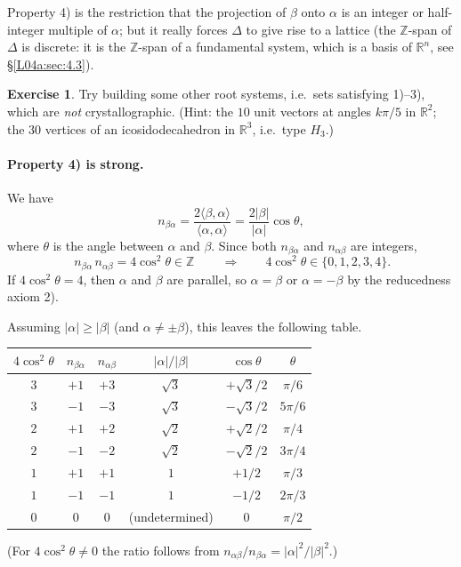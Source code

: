 \documentclass[11pt,openany]{book}
\theoremstyle{plain}
\theoremstyle{definition}
\newtheorem{exercise}[theorem]{Exercise}
\theoremstyle{remark}
\newcommand{\added}[1]{{\color{addcol}#1}}
\newcommand{\R}{\mathbb{R}}
\newcommand{\Z}{\mathbb{Z}}
\newcommand{\abs}[1]{\left\lvert #1 \right\rvert}
\newcommand{\ip}[2]{\langle #1, #2\rangle}
\begin{document}
Property 4) is the restriction that the projection of $\beta$ onto $\alpha$ is an integer or
half-integer multiple of $\alpha$; but it really forces $\Delta$ to give rise to a lattice
\added{(the $\Z$-span of $\Delta$ is discrete: it is the $\Z$-span of a fundamental system, which is a
basis of $\R^n$, see \S\ref{L04a:sec:4.3}).}

\begin{exercise}
Try building some other root systems, i.e.\ sets satisfying 1)--3), which are \emph{not}
crystallographic.
\added{(Hint: the $10$ unit vectors at angles $k\pi/5$ in $\R^2$; the $30$ vertices of an
icosidodecahedron in $\R^3$, i.e.\ type $H_3$.)}
\end{exercise}

\paragraph{Property 4) is strong.}
We have
\[
  n_{\beta\alpha} = \frac{2\ip{\beta}{\alpha}}{\ip{\alpha}{\alpha}} = \frac{2\abs{\beta}}{\abs{\alpha}}\cos\theta,
\]
where $\theta$ is the angle between $\alpha$ and $\beta$. Since both $n_{\beta\alpha}$ and $n_{\alpha\beta}$ are integers,
\[
  \boxed{\,n_{\beta\alpha}\,n_{\alpha\beta} = 4\cos^2\theta\in\Z\,}
  \qquad\Longrightarrow\qquad 4\cos^2\theta\in\{0,1,2,3,4\}.
\]
If $4\cos^2\theta=4$, then $\alpha$ and $\beta$ are parallel, so $\alpha=\beta$ or $\alpha=-\beta$
\added{by the reducedness axiom 2)}.

Assuming $\abs{\alpha}\ge\abs{\beta}$ (and $\alpha\neq\pm\beta$), this leaves the following table.
\begin{center}
\renewcommand{\arraystretch}{1.25}
\begin{tabular}{cccccc}
\toprule
$4\cos^2\theta$ & $n_{\beta\alpha}$ & $n_{\alpha\beta}$ & $\abs{\alpha}/\abs{\beta}$ & $\cos\theta$ & $\theta$\\
\midrule
$3$ & $+1$ & $+3$ & $\sqrt3$ & $+\sqrt3/2$ & $\pi/6$\\
$3$ & $-1$ & $-3$ & $\sqrt3$ & $-\sqrt3/2$ & $5\pi/6$\\
$2$ & $+1$ & $+2$ & $\sqrt2$ & $+\sqrt2/2$ & $\pi/4$\\
$2$ & $-1$ & $-2$ & $\sqrt2$ & $-\sqrt2/2$ & $3\pi/4$\\
$1$ & $+1$ & $+1$ & $1$ & $+1/2$ & $\pi/3$\\
$1$ & $-1$ & $-1$ & $1$ & $-1/2$ & $2\pi/3$\\
$0$ & $0$ & $0$ & (undetermined) & $0$ & $\pi/2$\\
\bottomrule
\end{tabular}
\end{center}
\added{(For $4\cos^2\theta\neq0$ the ratio follows from $n_{\alpha\beta}/n_{\beta\alpha}=\abs{\alpha}^2/\abs{\beta}^2$.)}
\end{document}
